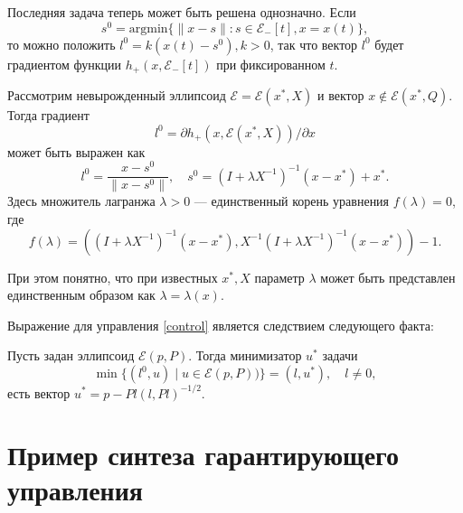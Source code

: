 Последняя задача теперь может быть решена однозначно. Если 
\begin{equation}
    s^0 = \text{argmin}\{ \| x - s \| : s \in \mathcal{E}_-[t], x = x(t) \},
\end{equation}
то можно положить \( l^0 = k(x(t) - s^0), k > 0 \), так что вектор \( l^0 \) будет градиентом функции
\( h_+(x, \mathcal{E}_-[t]) \) при фиксированном \( t \). 

\begin{lemma}
    Рассмотрим невырожденный эллипсоид \( \mathcal{E} = \mathcal{E}(x^*, X) \) и вектор \( x \notin 
     \mathcal{E}(x^*, Q). \) Тогда градиент
    \begin{equation*}
        l^0 = \partial h_+(x, \mathcal{E}(x^*, X)) / \partial x
    \end{equation*}
    может быть выражен как 
    \begin{equation}
        l^0 = \frac{x - s^0}{\| x - s^0 \|}, \quad s^0 = (I + \lambda X^{-1})^{-1}(x - x^*) + x^*.
    \end{equation}
    Здесь множитель лагранжа \( \lambda > 0 \) --- единственный корень уравнения \( f(\lambda) = 0 \),
    где
    \begin{equation*}
        f(\lambda) = ((I + \lambda X^{-1})^{-1}(x - x^*), X^{-1}(I + \lambda X^{-1})^{-1}(x - x^*)) - 1.
    \end{equation*}
\end{lemma}

При этом понятно, что при известных \( x^*, X \) параметр \( \lambda \) может быть представлен 
 единственным образом как \( \lambda = \lambda(x) \).

Выражение для управления \eqref{control} является следствием следующего факта:
\begin{lemma}
    Пусть задан эллипсоид \( \mathcal{E}(p, P) \). Тогда минимизатор \( u^* \) задачи
    \begin{equation*}
        \min\{ (l^0, u) \mid u \in \mathcal{E}(p, P)) \} = (l, u^*), \quad l \ne 0, 
    \end{equation*}
    есть вектор \( u^* = p - Pl(l, Pl)^{-1/2} \).
\end{lemma}

\section{Пример синтеза гарантирующего управления}


